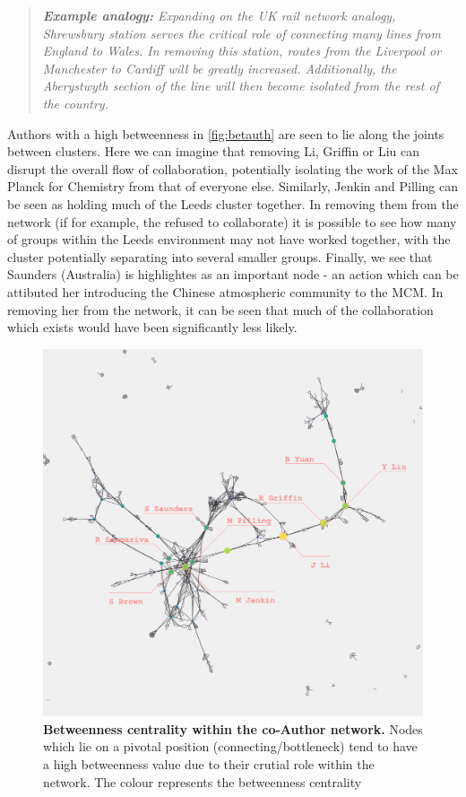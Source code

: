 \begin{quote}
\textit{
\textbf{Example analogy:} Expanding on the UK rail network analogy, Shrewsbury station serves the critical role of connecting many lines from England to Wales. In removing this station, routes from the Liverpool or Manchester to Cardiff will be greatly increased. Additionally, the Aberystwyth section of the line will then become isolated from the rest of the country.
}
\end{quote}

Authors with a high betweenness in \autoref{fig:betauth} are seen to lie along the joints between clusters. Here we can imagine that removing Li, Griffin or Liu can disrupt the overall flow of collaboration, potentially isolating the work of the Max Planck for Chemistry from that of everyone else. Similarly, Jenkin and Pilling can be seen as holding much of the Leeds cluster together. In removing them from the network (if for example, the refused to collaborate) it is possible to see how many of groups within the Leeds environment may not have worked together, with the cluster potentially separating into several smaller groups. Finally, we see that Saunders (Australia) is highlightes as an important node - an action which can be attibuted her introducing the Chinese atmospheric community to the MCM. In removing her from the network, it can be seen that much of the collaboration which exists would have been significantly less likely.

\begin{figure}[H]
     \centering
         \includegraphics[width=.8\textwidth]{figures_c3/betweenauthor.png}
         
        \caption{ \textbf{Betweenness centrality within the co-Author network.} Nodes which lie on a pivotal position (connecting/bottleneck) tend to have a high betweenness value due to their crutial role within the network. The colour represents the betweenness centrality}
        \label{fig:betauth}
\end{figure}


